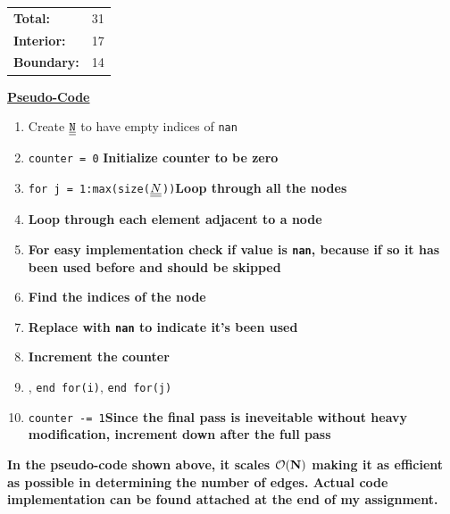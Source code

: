 \begin{enumerate}[label=\alph*., start = 1]
    \bigskip
    \begin{tabular}{l l}
        \textbf{Total:} & 31\\
        \textbf{Interior:} & 17\\
        \textbf{Boundary:} & 14\\
    \end{tabular}


    \textbf{\underline{Pseudo-Code}}
    \begin{enumerate}[label =\arabic*:]
        \item Create ${\tt \underline{\underline{N}}}$ to have empty indices of {\tt nan}
        \item {\tt counter = 0} \quad \textbf{Initialize counter to be zero}
        \item {\tt for j = 1:max(size($\underline{\underline{N}}$))}\quad \textbf{Loop through all the nodes}
        \item {}\quad \textbf{Loop through each element adjacent to a node}
        \item \quad{} \quad \textbf{For easy implementation check if value is {\tt nan}, because if so it has been used before and should be skipped}
        \item \quad\quad{}\quad \textbf{Find the indices of the node}
        \item \quad\quad{}\quad \textbf{Replace with {\tt nan} to indicate it's been used}
        \item \quad\quad{} \quad \textbf{Increment the counter}
        \item \quad{}, {\tt end for(i)}, {\tt end for(j)}
        \item {\tt counter -= 1}\quad \textbf{Since the final pass is ineveitable without heavy modification, increment down after the full pass}
    \end{enumerate}

    \begin{fminipage}{0.9\linewidth}
        \textbf{In the pseudo-code shown above, it scales $\bf \mathcal{O}(N)$ making it as efficient as possible in determining the number of edges. Actual code implementation can be found attached at the end of my assignment.}
    \end{fminipage}
\end{enumerate}


